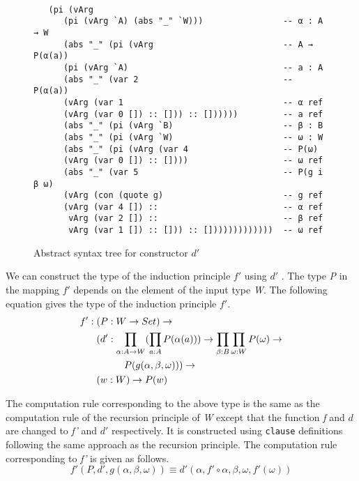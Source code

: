 \documentclass[sigplan,10pt]{acmart}
\begin{document}
\begin{figure}
\begin{center}
\begingroup
\fontsize{7pt}{9pt}\selectfont
\begin{Verbatim}[frame = single]

   (pi (vArg
      (pi (vArg `A) (abs "_" `W)))                -- α : A → W
      (abs "_" (pi (vArg                          -- A → P(α(a))
      (pi (vArg `A)                               -- a : A
      (abs "_" (var 2                             -- P(α(a))
      (vArg (var 1                                -- α ref
      (vArg (var 0 []) :: [])) :: [])))))         -- a ref
      (abs "_" (pi (vArg `B)                      -- β : B
      (abs "_" (pi (vArg `W)                      -- ω : W
      (abs "_" (pi (vArg (var 4                   -- P(ω)
      (vArg (var 0 []) :: [])))                   -- ω ref
      (abs "_" (var 5                             -- P(g i β ω)
      (vArg (con (quote g)                        -- g ref
      (vArg (var 4 []) ::                         -- α ref
       vArg (var 2 []) ::                         -- β ref
       vArg (var 1 []) :: [])) :: []))))))))))))  -- ω ref

\end{Verbatim}
\endgroup
\end{center}
\caption{Abstract syntax tree for constructor $d'$}
\label{fig:ast-d'}
\end{figure}

\normalsize

We can construct the type of the induction principle $f'$ using $d'$ . The type \emph{P} in the mapping $f'$ depends on the element of the input type \emph{W}. The following equation gives the type of the induction principle $f'$.
\begin{align}
& f' : (P : W \rightarrow Set) \rightarrow \nonumber \\
& \hspace {0.6cm} (d' : \prod_{\alpha : A \rightarrow W} (\prod_{a : A} P(\alpha (a))) \rightarrow \prod_{\beta : B} \prod_{\omega : W} P(\omega) \rightarrow \nonumber \\ 
& \hspace {1.6cm} P (g(\alpha, \beta, \omega))) \rightarrow \nonumber \\
& \hspace {0.6cm} (w : W) \rightarrow P (w) \nonumber
\end{align}

The computation rule corresponding to the above type is the same as the computation rule of the recursion principle of \emph{W} except that the function \emph{f} and $d$ are changed to \emph{f'} and $d'$ respectively. It is constructed using {\tt clause} definitions following the same approach as the recursion principle. The computation rule corresponding to \emph{f'} is given as follows.
\begin{equation}
f' (P, d', g (\alpha, \beta, \omega)) \equiv d' (\alpha, f' \circ \alpha, \beta, \omega, f' (\omega)) \nonumber
\end{equation}
\end{document}
